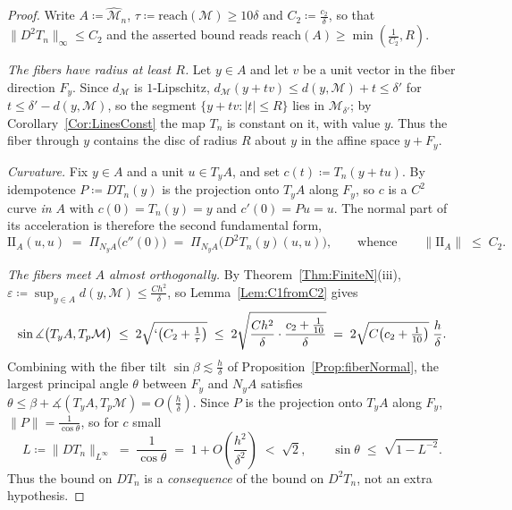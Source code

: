 \documentclass[11pt]{amsart}%
\theoremstyle{plain}
\newcommand{\1}{\mathbf{1}}
\newcommand{\M}{\mathcal{M}}
\newcommand{\II}{\mathrm{I\!I}}   %
\begin{document}
\begin{proof}
    Write $A\coloneqq\widehat{\M}_n$, $\tau\coloneqq\mathrm{reach}(\M)\ge10\delta$ and
    $C_2\coloneqq \frac{c_2}{\delta}$, so that $\|D^2T_n\|_\infty\le C_2$ and the asserted bound reads
    $\mathrm{reach}(A)\ge\min\left(\frac{1}{C_2},R\right)$.

    \emph{The fibers have radius at least $R$.} Let $y\in A$ and let $v$ be a unit vector in the
    fiber direction $F_y$. Since $d_\M$ is $1$-Lipschitz, $d_\M(y+tv)\le d(y,\M)+t\le\delta'$ for
    $t\le\delta'-d(y,\M)$, so the segment $\{y+tv:|t|\le R\}$ lies in $\M_{\delta'}$; by
    Corollary~\ref{Cor:LinesConst} the map $T_n$ is constant on it, with value $y$. Thus the fiber
    through $y$ contains the disc of radius $R$ about $y$ in the affine space $y+F_y$.

    \emph{Curvature.} Fix $y\in A$ and a unit $u\in T_yA$, and set $c(t)\coloneqq T_n(y+tu)$. By
    idempotence $P\coloneqq DT_n(y)$ is the projection onto $T_yA$ along $F_y$, so $c$ is a $C^2$
    curve \emph{in $A$} with $c(0)=T_n(y)=y$ and $c'(0)=Pu=u$. The normal part of its acceleration
    is therefore the second fundamental form,
    \[
        \II_A(u,u)\;=\;\Pi_{N_yA}\bigl(c''(0)\bigr)\;=\;\Pi_{N_yA}\bigl(D^2T_n(y)(u,u)\bigr),
        \qquad\text{whence}\qquad
        \|\II_A\|\;\le\;C_2 .
    \]

    \emph{The fibers meet $A$ almost orthogonally.} By Theorem~\ref{Thm:FiniteN}(iii),
    $\varepsilon\coloneqq\sup_{y\in A}d(y,\M)\le \frac{Ch^2}{\delta}$, so Lemma~\ref{Lem:C1fromC2} gives
    \begin{equation}\label{eqn:tangenttilt}
        \sin\measuredangle\bigl(T_yA,T_p\M\bigr)\;\le\;2\sqrt{`\bigl(C_2+\tfrac1\tau\bigr)}
        \;\le\;2\sqrt{\frac{Ch^2}{\delta}\cdot\frac{c_2+\tfrac1{10}}{\delta}}
        \;=\;2\sqrt{C\bigl(c_2+\tfrac1{10}\bigr)}\;\frac{h}{\delta} .
    \end{equation}
    Combining with the fiber tilt $\sin\beta\lesssim \frac{h}{\delta}$ of
    Proposition~\ref{Prop:fiberNormal}, the largest principal angle $\theta$ between $F_y$ and
    $N_yA$ satisfies $\theta\le\beta+\measuredangle(T_yA,T_p\M)=O\left(\frac{h}{\delta}\right)$. Since $P$ is the projection
    onto $T_yA$ along $F_y$, $\|P\|=\frac{1}{\cos\theta}$, so for $c$ small
    \begin{equation}\label{eqn:LfromC2}
        L\coloneqq\|DT_n\|_{L^\infty}\;=\;\frac{1}{\cos\theta}\;=\;1+O\left(\frac{h^2}{\delta^2}\right)\;<\;\sqrt2 ,
        \qquad \sin\theta\;\le\;\sqrt{1-L^{-2}} .
    \end{equation}
    Thus the bound on $DT_n$ is a \emph{consequence} of the bound on $D^2T_n$, not an extra
    hypothesis.


\end{proof}
\end{document}
